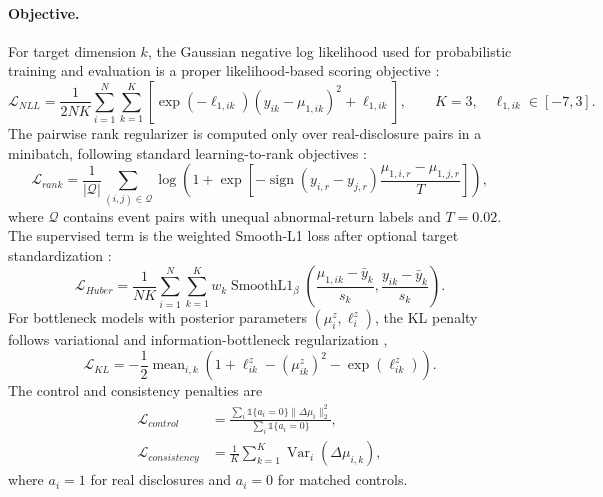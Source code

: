\documentclass[10pt,letterpaper]{article}
\begin{document}
\paragraph{Objective.}
For target dimension \(k\), the Gaussian negative log likelihood used for probabilistic training
and evaluation is a proper likelihood-based scoring objective \citep{gneiting2007strictly}:
\begin{equation}
    \mathcal{L}_{NLL}
    = \frac{1}{2NK}\sum_{i=1}^{N}\sum_{k=1}^{K}
    \left[\exp(-\ell_{1,ik})(y_{ik}-\mu_{1,ik})^2+\ell_{1,ik}\right],
    \qquad K=3,\quad \ell_{1,ik}\in[-7,3].
\end{equation}
The pairwise rank regularizer is computed only over real-disclosure pairs in a minibatch, following
standard learning-to-rank objectives \citep{burges2005learning,cao2007learning}:
\begin{equation}
    \mathcal{L}_{rank}
    = \frac{1}{|\mathcal{Q}|}\sum_{(i,j)\in\mathcal{Q}}
    \log\left(1+\exp\left[
    -\operatorname{sign}(y_{i,r}-y_{j,r})
    \frac{\mu_{1,i,r}-\mu_{1,j,r}}{T}
    \right]\right),
\end{equation}
where \(\mathcal{Q}\) contains event pairs with unequal abnormal-return labels and \(T=0.02\).
The supervised term is the weighted Smooth-L1 loss after optional target standardization
\citep{huber1964robust}:
\begin{equation}
    \mathcal{L}_{Huber}
    =
    \frac{1}{NK}\sum_{i=1}^{N}\sum_{k=1}^{K}
    w_k\operatorname{SmoothL1}_{\beta}
    \left(\frac{\mu_{1,ik}-\bar{y}_k}{s_k},
    \frac{y_{ik}-\bar{y}_k}{s_k}\right).
\end{equation}
For bottleneck models with posterior parameters \((\mu^z_i,\ell^z_i)\), the KL penalty follows
variational and information-bottleneck regularization \citep{kingma2013autoencoding,
tishby2000information},
\begin{equation}
    \mathcal{L}_{KL}
    = -\frac{1}{2}\operatorname{mean}_{i,k}
    \left(1+\ell^z_{ik}-(\mu^z_{ik})^2-\exp(\ell^z_{ik})\right).
\end{equation}
The control and consistency penalties are
\begin{align}
    \mathcal{L}_{control}
    &=
    \frac{\sum_i\mathbb{1}\{a_i=0\}\lVert\Delta\mu_i\rVert_2^2}
    {\sum_i\mathbb{1}\{a_i=0\}},\\
    \mathcal{L}_{consistency}
    &= \frac{1}{K}\sum_{k=1}^{K}\operatorname{Var}_i(\Delta\mu_{i,k}),
\end{align}
where \(a_i=1\) for real disclosures and \(a_i=0\) for matched controls.
\end{document}
